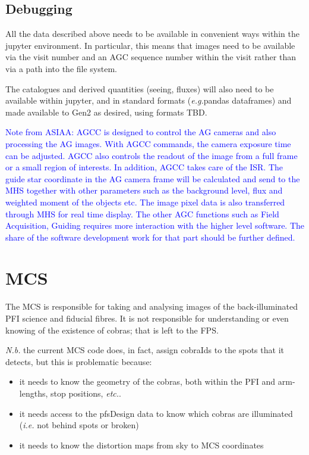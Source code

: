\documentclass[12pt]{article}
\newcommand{\eg}{\textit{e.g.}\xspace}
\newcommand{\etc}{\textit{etc.}\xspace}
\newcommand{\ie}{\textit{i.e.}\xspace}
\newcommand{\Nb}{\textit{N.b.}\xspace}
\newcommand{\AGC}{\gls{AGC}\xspace}
\newcommand{\MCS}{\gls{MCS}\xspace}
\newcommand{\FPS}{\gls{FPS}\xspace}
\newcommand{\PFI}{\gls{PFI}\xspace}
\newcommand{\TBD}{\gls{TBD}\xspace}
\newcommand{\jupyter}{\gls{jupyter}\xspace}
\begin{document}
\subsection{Debugging}

All the data described above needs to be available in convenient ways within the \jupyter environment.  In
particular, this means that images need to be available via the \gls{visit} number and an \AGC sequence number
within the visit rather than via a path into the file system.

The catalogues and derived quantities (seeing, fluxes) will also need to be available within \jupyter, and
in standard formats (\eg \gls{pandas} dataframes) and made available to \gls{Gen2} as desired, using
formats \TBD.

\textcolor{blue}{
Note from ASIAA: AGCC is designed to control the AG cameras and also processing the AG
images. With AGCC commands, the camera exposure time can be adjusted.
AGCC also controls the readout of the image from a full frame or a
small region of interests. In addition, AGCC takes care of the ISR.
The guide star coordinate in the AG camera frame will be calculated
and send to the MHS together with other parameters such as the
background level, flux and weighted moment of the objects etc.  The
image pixel data is also transferred through MHS for real time
display.
The other AGC functions such as Field Acquisition, Guiding requires
more interaction with the higher level software. The share of the
software development work for that part should be further defined.
}

\section{MCS}
\label{sec:MCS}

The \MCS is responsible for taking and analysing images of the back-illuminated PFI science and fiducial
fibres.  It is not responsible for understanding or even knowing of the existence of cobras; that is left to the \FPS.

\Nb the current \MCS code does, in fact, assign cobraIds to the spots that it detects, but this
is problematic because:
\begin{itemize}
\item it needs to know the geometry of the cobras, both within the \PFI and arm-lengths, stop positions, \etc.
\item it needs access to the \gls{pfsDesign} data to know which cobras are illuminated
  (\ie not behind spots or broken)
\item it needs to know the distortion maps from sky to \MCS coordinates
\end{itemize}
\end{document}
